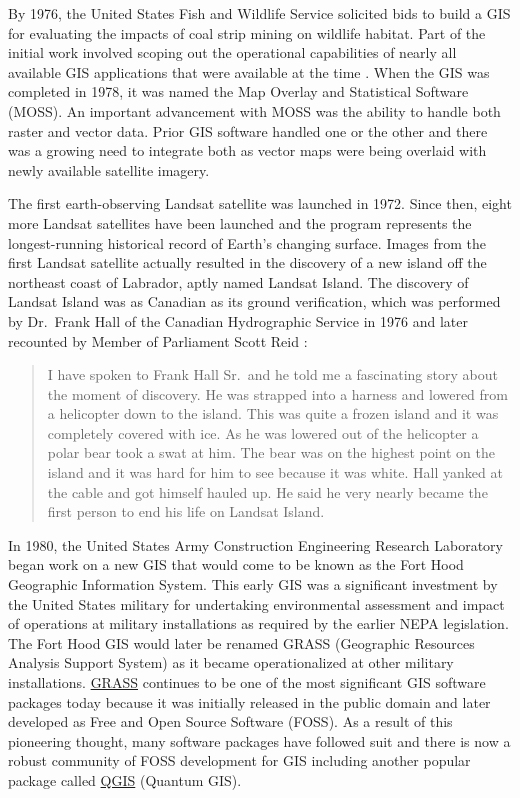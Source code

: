 \documentclass[
]{book}
\begin{document}
By 1976, the United States Fish and Wildlife Service solicited bids to build a GIS for evaluating the impacts of coal strip mining on wildlife habitat. Part of the initial work involved scoping out the operational capabilities of nearly all available GIS applications that were available at the time \citep{usfws_1977}. When the GIS was completed in 1978, it was named the Map Overlay and Statistical Software (MOSS). An important advancement with MOSS was the ability to handle both raster and vector data. Prior GIS software handled one or the other and there was a growing need to integrate both as vector maps were being overlaid with newly available satellite imagery.

The first earth-observing Landsat satellite was launched in 1972. Since then, eight more Landsat satellites have been launched and the program represents the longest-running historical record of Earth's changing surface. Images from the first Landsat satellite actually resulted in the discovery of a new island off the northeast coast of Labrador, aptly named Landsat Island. The discovery of Landsat Island was as Canadian as its ground verification, which was performed by Dr.~Frank Hall of the Canadian Hydrographic Service in 1976 and later recounted by Member of Parliament Scott Reid \citep{reid_parliamentary_2001}:

\begin{quote}
I have spoken to Frank Hall Sr.~and he told me a fascinating story about the moment of discovery. He was strapped into a harness and lowered from a helicopter down to the island. This was quite a frozen island and it was completely covered with ice. As he was lowered out of the helicopter a polar bear took a swat at him. The bear was on the highest point on the island and it was hard for him to see because it was white. Hall yanked at the cable and got himself hauled up. He said he very nearly became the first person to end his life on Landsat Island.
\end{quote}

In 1980, the United States Army Construction Engineering Research Laboratory began work on a new GIS that would come to be known as the Fort Hood Geographic Information System. This early GIS was a significant investment by the United States military for undertaking environmental assessment and impact of operations at military installations as required by the earlier NEPA legislation. The Fort Hood GIS would later be renamed GRASS (Geographic Resources Analysis Support System) as it became operationalized at other military installations. \href{https://github.com/OSGeo/grass}{GRASS} continues to be one of the most significant GIS software packages today because it was initially released in the public domain and later developed as Free and Open Source Software (FOSS). As a result of this pioneering thought, many software packages have followed suit and there is now a robust community of FOSS development for GIS including another popular package called \href{https://github.com/qgis/QGIS}{QGIS} (Quantum GIS).
\end{document}
